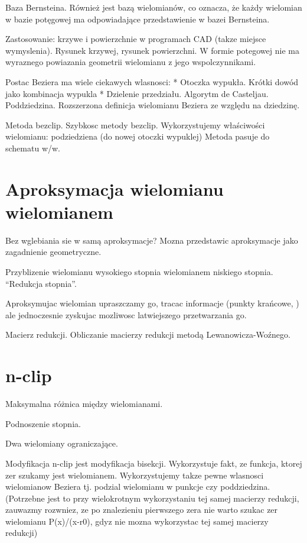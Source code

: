 \documentclass[11pt,a4paper,oneside]{report}
\begin{document}
Baza Bernsteina. Również jest bazą wielomianów, co oznacza, że każdy wielomian w bazie potęgowej ma odpowiadające przedstawienie w bazei Bernsteina.

Zastosowanie: krzywe i powierzchnie w programach CAD (takze miejsce wymyslenia). Rysunek krzywej, rysunek powierzchni. W formie potegowej nie ma wyraznego powiazania geometrii wielomianu z jego wspolczynnikami. 

Postac Beziera ma wiele ciekawych wlasnosci:
* Otoczka wypukła. Krótki dowód jako kombinacja wypukla
* Dzielenie przedziału. Algorytm de Casteljau. Poddziedzina. Rozszerzona definicja wielomianu Beziera ze względu na dziedzinę.

Metoda bezclip. Szybkosc metody bezclip.
Wykorzystujemy właściwości wielomianu: podziedziena (do nowej otoczki wypuklej)
Metoda pasuje do schematu w/w.

\section{Aproksymacja wielomianu wielomianem}

Bez wglebiania sie w samą aproksymacje? Mozna przedstawic aproksymacje jako zagadnienie geometryczne.

Przyblizenie wielomianu wysokiego stopnia wielomianem niskiego stopnia. ``Redukcja stopnia''. 

Aproksymujac wielomian upraszczamy go, tracac informacje (punkty krańcowe, ) ale jednoczesnie zyskujac mozliwosc latwiejszego przetwarzania go.

Macierz redukcji. Obliczanie macierzy redukcji metodą Lewanowicza-Woźnego.

\section{n-clip}

Maksymalna różnica między wielomianami.

Podnoszenie stopnia.

Dwa wielomiany ograniczające.

Modyfikacja n-clip jest modyfikacja bisekcji. Wykorzystuje fakt, ze funkcja, ktorej zer szukamy jest wielomianem. Wykorzystujemy takze pewne wlasnosci wielomianow Beziera tj. podzial wielomianu w punkcje czy poddziedzina. (Potrzebne jest to przy wielokrotnym wykorzystaniu tej samej macierzy redukcji, zauwazmy rozwniez, ze po znalezieniu pierwszego zera nie warto szukac zer wielomianu P(x)/(x-r0), gdyz nie mozna wykorzystac tej samej macierzy redukcji)
\end{document}
